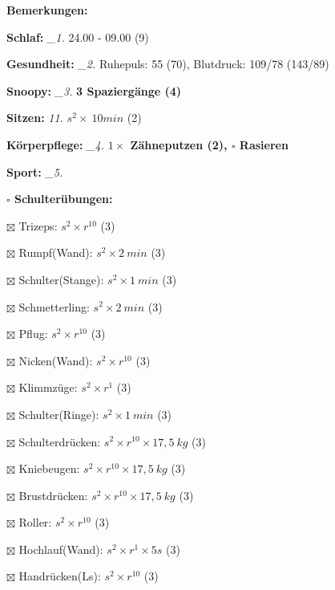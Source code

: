 \documentclass[10pt,a4paper]{article}
\newcommand\prop[1] {{\color {alizarin} {\bf #1}}}             %
\newcommand\draf[1] {{\color {amber(sae/ece)} {\bf #1}}}       %
\newcommand\mand[1] {{\color {burntorange} {\bf #1}}}          %
\newcommand\topspace{\vskip -15pt \hskip 20pt}
\newcommand\n[1] { {\sl #1.} \hskip 5pt }
\begin{document}
\begin{mdframed}[style=daystyle]
  \begin{labeling}{{\mand {Bemerkungen:}}}
    \setlength\itemsep{-3pt}
  \item[{\mand {Schlaf:}}]        \n{\_1} 24.00 - 09.00 (9)
  \item[{\mand {Gesundheit:}}]    \n{\_2} Ruhepuls: 55 (70), Blutdruck: 109/78 (143/89)
  \item[{\mand {Snoopy:}}]        \n{\_3} {\draf {3 Spaziergänge (4)}}    
  \item[{\mand {Sitzen:}}]         \n{11} $s^2 \times\ 10 min$ (2)
  \item[{\mand {Körperpflege:}}]  \n{\_4} {\draf {$1 \times$ Zähneputzen (2), $\square$ Rasieren}}
  \item[{\mand {Sport:}}]         \n{\_5}
    \topspace
    \begin{minipage}{0.75\textwidth}  
      \begin{labeling}{\prop {$\square$ {Schulterübungen:}}} 
        \setlength\itemsep{-3pt}
      \item[$\boxtimes$ Trizeps:]          $s^2 \times r^{10}$ (3)
      \item[$\boxtimes$ Rumpf(Wand):]      $s^2 \times 2\ min$ (3)
      \item[$\boxtimes$ Schulter(Stange):] $s^2 \times 1\ min$ (3)
      \item[$\boxtimes$ Schmetterling:]    $s^2 \times 2\ min$ (3)
      \item[$\boxtimes$ Pflug:]            $s^2 \times r^{10}$ (3)
      \item[$\boxtimes$ Nicken(Wand):]     $s^2 \times r^{10}$ (3)
      \item[$\boxtimes$ Klimmzüge:]        $s^2 \times r^1$ (3)
      \item[$\boxtimes$ Schulter(Ringe):]  $s^2 \times 1\ min$ (3)
      \item[$\boxtimes$ Schulterdrücken:]  $s^2 \times r^{10} \times 17,5\ kg$ (3)
      \item[$\boxtimes$ Kniebeugen:]       $s^2 \times r^{10} \times 17,5\ kg$ (3)
      \item[$\boxtimes$ Brustdrücken:]     $s^2 \times r^{10} \times 17,5\ kg$ (3)
      \item[$\boxtimes$ Roller:]           $s^2 \times r^{10}$ (3)
      \item[$\boxtimes$ Hochlauf(Wand):]   $s^2 \times r^{1} \times 5s$ (3)
      \item[$\boxtimes$ Handrücken(Ls):]   $s^2 \times r^{10}$ (3)

\end{labeling}
\end{minipage}
\end{labeling}
\end{mdframed}
\end{document}
